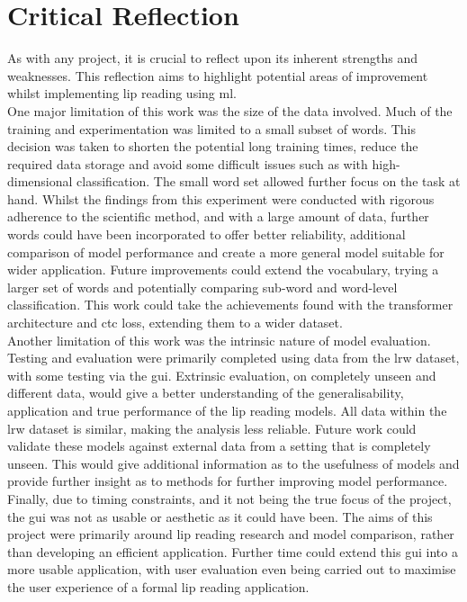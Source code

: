 \section{Critical Reflection}
As with any project, it is crucial to reflect upon its inherent strengths and weaknesses. This reflection aims to highlight potential areas of improvement whilst implementing lip reading using \acrfull{ml}.\\
One major limitation of this work was the size of the data involved. Much of the training and experimentation was limited to a small subset of words. This decision was taken to shorten the potential long training times, reduce the required data storage and avoid some difficult issues such as with high-dimensional classification. The small word set allowed further focus on the task at hand. Whilst the findings from this experiment were conducted with rigorous adherence to the scientific method, and with a large amount of data, further words could have been incorporated to offer better reliability, additional comparison of model performance and create a more general model suitable for wider application. Future improvements could extend the vocabulary, trying a larger set of words and potentially comparing sub-word and word-level classification. This work could take the achievements found with the \gls{transformer} architecture and \acrshort{ctc} loss, extending them to a wider dataset.\\
Another limitation of this work was the intrinsic nature of model evaluation. Testing and evaluation were primarily completed using data from the \gls{lrw} dataset, with some testing via the \acrshort{gui}. Extrinsic evaluation, on completely unseen and different data, would give a better understanding of the generalisability, application and true performance of the lip reading models. All data within the \gls{lrw} dataset is similar, making the analysis less reliable. Future work could validate these models against external data from a setting that is completely unseen. This would give additional information as to the usefulness of models and provide further insight as to methods for further improving model performance.\\
Finally, due to timing constraints, and it not being the true focus of the project, the \acrshort{gui} was not as usable or aesthetic as it could have been. The aims of this project were primarily around lip reading research and model comparison, rather than developing an efficient application. Further time could extend this \acrshort{gui} into a more usable application, with user evaluation even being carried out to maximise the user experience of a formal lip reading application.
